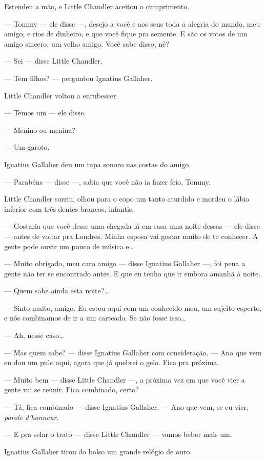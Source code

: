 Estendeu a mão, e Little Chandler aceitou o cumprimento.

--- Tommy --- ele disse ---, desejo a você e aos seus toda a alegria do
mundo, meu amigo, e rios de dinheiro, e que você fique pra semente. E
são os votos de um amigo sincero, um velho amigo. Você sabe disso, né?

--- Sei --- disse Little Chandler.

--- Tem filhos? --- perguntou Ignatius Gallaher.

Little Chandler voltou a enrubescer.

--- Temos um --- ele disse.

--- Menino ou menina?

--- Um garoto.

Ignatius Gallaher deu um tapa sonoro nas costas do amigo.

--- Parabéns --- disse ---, sabia que você não ia fazer feio,
Tommy.

Little Chandler sorriu, olhou para o copo um tanto aturdido e mordeu o
lábio inferior com três dentes brancos, infantis.

--- Gostaria que você desse uma chegada lá em casa uma noite dessas
--- ele disse --- antes de voltar pra Londres. Minha esposa vai gostar
muito de te conhecer. A gente pode ouvir um pouco de música e\ldots{}

--- Muito obrigado, meu caro amigo --- disse Ignatius Gallaher ---,
foi pena a gente não ter se encontrado antes. E que eu tenho que ir
embora amanhã à noite.

--- Quem sabe ainda esta noite?\ldots{}

--- Sinto muito, amigo. Eu estou aqui com um conhecido meu, um sujeito
esperto, e nós combinamos de ir a um carteado. Se não fosse isso\ldots{}

--- Ah, nesse caso\ldots{}

--- Mas quem sabe? --- disse Ignatius Gallaher com consideração. ---
Ano que vem eu dou um pulo aqui, agora que já quebrei o gelo. Fica pra
próxima.

--- Muito bem --- disse Little Chandler ---, a próxima vez em que você
vier a gente vai se reunir. Fica combinado, certo?

--- Tá, fica combinado --- disse Ignatius Gallaher. --- Ano que vem,
se eu vier, \textit{parole d'honneur}.

--- E pra selar o trato --- disse Little Chandler --- vamos beber mais
um.

Ignatius Gallaher tirou do bolso um grande relógio de ouro.

